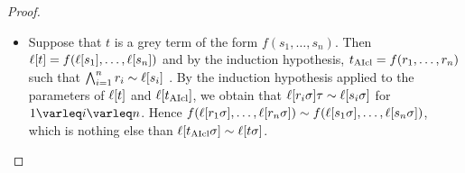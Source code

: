 \documentclass[,%
	draft=false,%
	numbers=noendperiod
	11pt,
	a4paper,
	oneside,%
	openany,
]{memoir}
\begin{document}
\begin{proof}
\begin{description}
\begin{itemize}
					\item
						Suppose that $t$ is a grey term of the form $f(s_1, \dots, s_n)$.
						Then $\ell[t] = f(\ell[s_1], \dots, \ell[s_n])$ and by the induction hypothesis, $t_{\operatorname{AIcl}} = f(r_1, \dots, r_n)$ such that
						$\bigwedge_{i=1}^n r_i \sim \ell[s_i]$ .
						By the induction hypothesis applied to the parameters of $\ell[t]$ and $\ell[t_{\operatorname{AIcl}}]$, we obtain that  $\ell[r_i\sigma]\tau \sim \ell[s_i\sigma]$ for $1\nolinebreak \varleq\nolinebreak i\nolinebreak \varleq\nolinebreak n$.
						Hence $  f(\ell[r_1\sigma], \dots, \ell[r_n\sigma]) \sim f(\ell[s_1\sigma], \dots, \ell[s_n\sigma])$,
						which is nothing else than
						$\ell[t_{\operatorname{AIcl}}\sigma] \sim \ell[t\sigma]$.
						\qedhere

				\end{itemize}


	\end{description}
\end{proof}
\end{document}
